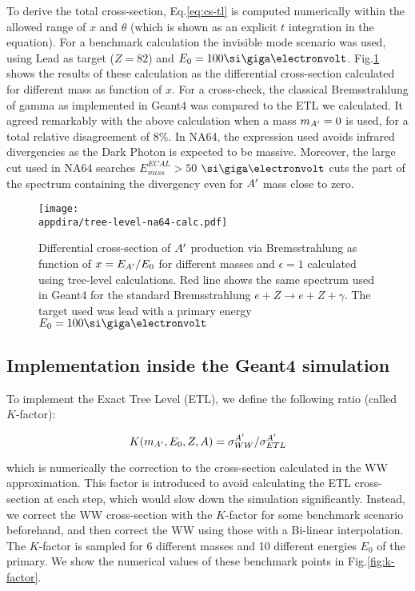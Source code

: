 To derive the total cross-section, Eq.\ref{eq:cs-tl} is computed numerically within the allowed range of $x$ and $\theta$ (which is shown as an explicit $t$ integration in the equation). For a benchmark calculation the invisible mode scenario was used, using Lead as target ($Z = 82$) and $E_0 = 100 \gev$. Fig.\ref{fig:dp-cs-tl} shows the results of these calculation as the differential cross-section calculated for different mass as function of $x$. For a cross-check, the classical Bremsstrahlung of gamma as implemented in Geant4 was compared to the ETL we calculated. It agreed remarkably with the above calculation when a mass $m_{A'} = 0$ is used, for a total relative disagreement of 8\%. In NA64, the expression used avoids infrared divergencies as the Dark Photon is expected to be massive. Moreover, the large cut used in NA64 searches $E^{ECAL}_{miss} > 50$ $\gev$ cuts the part of the spectrum containing the divergency even for $A'$ mass close to zero.

\begin{figure}[bth!]
  \centering
  \texttt{[image: \\appdira/tree-level-na64-calc.pdf]}
  \caption[Tree level differential cross-section for different masses]{Differential cross-section of $A'$ production via Bremsstrahlung as function of $x=E_{A'}/E_0$ for different masses and $\epsilon = 1$ calculated using tree-level calculations. Red line shows the same spectrum used in Geant4 for the standard Bremsstrahlung $e + Z \to e + Z + \gamma$. The target used was lead with a primary energy $E_0 = 100 \gev$ \cite{DMsimulation}}
  \label{fig:dp-cs-tl}
\end{figure}

\subsection{Implementation inside the Geant4 simulation}

To implement the Exact Tree Level (ETL), we define the following ratio (called $K$-factor):

\begin{equation}
  \label{eq:k-factor}
  K(m_{A'},E_0,Z,A) = \sigma^{A'}_{WW} / \sigma^{A'}_{ETL}
\end{equation}

which is numerically the correction to the cross-section calculated in the WW approximation. This factor is introduced to avoid calculating the ETL cross-section at each step, which would slow down the simulation significantly. Instead, we correct the WW cross-section with the $K$-factor for some benchmark scenario beforehand, and then correct the WW using those with a Bi-linear interpolation. The $K$-factor is sampled for 6 different masses and 10 different energies $E_0$ of the primary. We show the numerical values of these benchmark points in Fig.\ref{fig:k-factor}.

